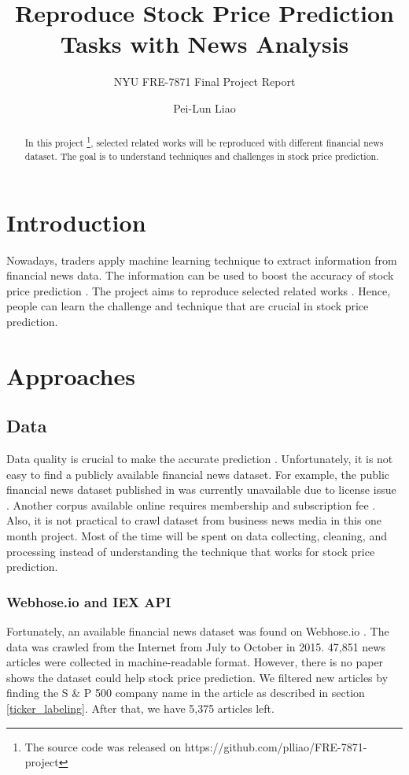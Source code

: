 \documentclass[sigconf]{acmart}
\begin{document}
\title{Reproduce Stock Price Prediction Tasks with News Analysis}
\subtitle{NYU FRE-7871 Final Project Report}

\author{Pei-Lun Liao}

\begin{abstract}
In this project \footnote{The source code was released on https://github.com/plliao/FRE-7871-project}, selected related works will be reproduced with different financial news dataset. The goal is to understand techniques and challenges in stock price prediction.
\end{abstract}
\maketitle

\section{Introduction}
Nowadays, traders apply machine learning technique to extract information from financial news data. The information can be used to boost the accuracy of stock price
prediction \cite{AZFinText, Ding2014, Ding2015}. The project aims to reproduce selected related works \cite{AZFinText}. Hence, people can learn the challenge and technique
that are crucial in stock price prediction.

\section{Approaches}
\subsection{Data}
Data quality is crucial to make the accurate prediction \cite{stanford}. Unfortunately, it is not easy to find a publicly available financial news dataset. For example, the public financial
news dataset published in \cite{Ding2014} was currently unavailable due to license issue \cite{fn}. Another corpus available online requires membership and subscription fee \cite{nyt}.
Also, it is not practical to crawl dataset from business news media in this one month project. Most of the time will be spent on data collecting, cleaning, and processing instead of
understanding the technique that works for stock price prediction.

\subsubsection{Webhose.io and IEX API}
Fortunately, an available financial news dataset was found on Webhose.io \cite{data}. The data was crawled from the Internet from July to October in 2015. 47,851 news articles were collected
in machine-readable format. However, there is no paper shows the dataset could help stock price prediction. We filtered new articles by finding the S \& P 500 company name in the article as
described in section \ref{ticker_labeling}. After that, we have 5,375 articles left.
\end{document}
